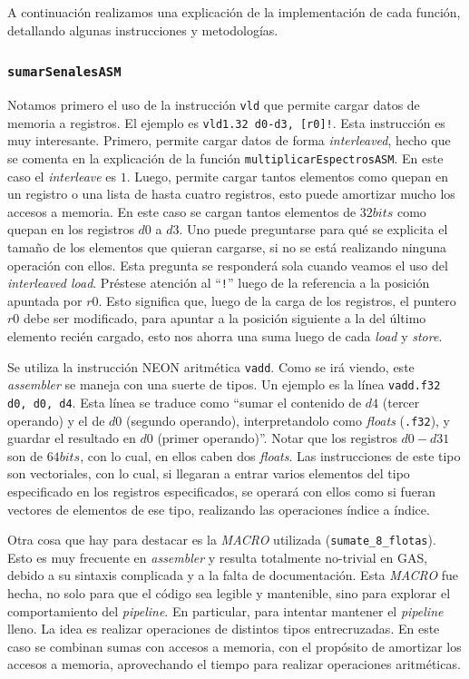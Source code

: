 \documentclass[%
    compressed,
    titlepage,
    narroweqnarray,
    inline,
    twoside,
    ]{ieee}
\begin{document}
A continuaci\'on realizamos una explicaci\'on de la implementaci\'on de cada funci\'on, detallando algunas instrucciones y metodolog\'ias.

\subsubsection{\texttt{sumarSenalesASM}}
Notamos primero el uso de la instrucci\'on \texttt{vld} que permite cargar datos de memoria a registros.
El ejemplo es \texttt{vld1.32 {d0-d3}, [r0]!}.
Esta instrucci\'on es muy interesante. Primero, permite cargar datos de forma \textit{interleaved}, hecho que se comenta en la explicaci\'on de la
funci\'on \texttt{multiplicarEspectrosASM}. En este caso el \textit{interleave} es $1$.
Luego, permite cargar tantos elementos como quepan en un registro o una lista de hasta cuatro registros, esto puede amortizar mucho los accesos
a memoria. En este caso se cargan tantos elementos de $32 bits$ como quepan en los registros $d0$ a $d3$. Uno puede preguntarse para qu\'e se explicita
el tama\~no de los elementos que quieran cargarse, si no se est\'a realizando ninguna operaci\'on con ellos.
Esta pregunta se responder\'a sola cuando veamos el uso del \textit{interleaved load}.
Pr\'estese atenci\'on al ``\texttt{!}'' luego de la referencia a la posici\'on apuntada por $r0$. Esto significa que, luego de la
carga de los registros, el puntero $r0$ debe ser modificado, para apuntar a la posici\'on siguiente a la del \'ultimo elemento reci\'en cargado,
esto nos ahorra una suma luego de cada \textit{load} y \textit{store}.

Se utiliza la instrucci\'on \textsc{NEON} aritm\'etica \texttt{vadd}.
Como se ir\'a viendo, este \textit{assembler} se maneja con una suerte de tipos. Un ejemplo es la l\'inea \texttt{vadd.f32 d0, d0, d4}.
Esta l\'inea se traduce como ``sumar el contenido de $d4$ (tercer operando) y el de $d0$ (segundo operando), interpretandolo como
\textit{floats} (\texttt{.f32}), y guardar el resultado en $d0$ (primer operando)''. Notar que los registros $d0-d31$ son de $64 bits$, con lo cual,
en ellos caben dos \textit{floats}. Las instrucciones de este tipo son vectoriales, con lo cual, si llegaran a entrar varios elementos del tipo especificado
en los registros especificados, se operar\'a con ellos como si fueran vectores de elementos de ese tipo, realizando las operaciones \'indice a \'indice.

Otra cosa que hay para destacar es la \textit{MACRO} utilizada (\texttt{sumate\_8\_flotas}). Esto es muy frecuente en \textit{assembler}
y resulta totalmente no-trivial en \textsc{GAS}, debido a su sintaxis complicada y a la falta de documentaci\'on.
Esta \textit{MACRO} fue hecha, no solo para que el c\'odigo sea legible y mantenible, sino para explorar el comportamiento del \textit{pipeline}.
En particular, para intentar mantener el \textit{pipeline} lleno.
La idea es realizar operaciones de distintos tipos entrecruzadas. En este caso se combinan sumas con accesos a memoria, con el prop\'osito de amortizar los
accesos a memoria, aprovechando el tiempo para realizar operaciones aritm\'eticas.
\end{document}
